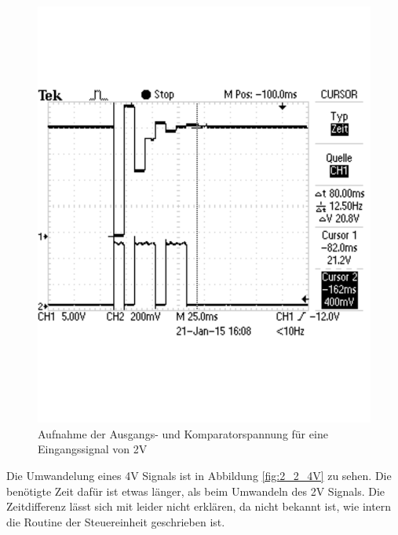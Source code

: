 \documentclass[12pt,a4paper]{article}
\begin{document}
\begin{figure}[H]
  \centering 	
    \includegraphics[trim = 0mm 50mm 0mm 50mm, clip, scale = 0.4]{2_2_2V.pdf}
  	\caption[Aufnahme der Ausgangs- und Komparatorspannung für eine Eingangssignal von 2V]{Aufnahme der Ausgangs- und Komparatorspannung für eine Eingangssignal von 2V} 
  \label{fig:2_2_2V}
\end{figure}

Die Umwandelung eines 4V Signals ist in Abbildung \ref{fig:2_2_4V} zu sehen. Die benötigte Zeit dafür ist etwas länger, als beim Umwandeln des 2V Signals. Die Zeitdifferenz lässt sich mit leider nicht erklären, da nicht bekannt ist, wie intern die Routine der Steuereinheit geschrieben ist.
\end{document}
